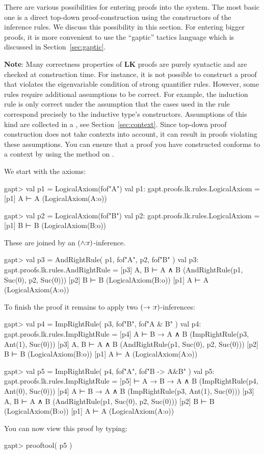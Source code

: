 \documentclass[a4paper,11pt]{book}
\newcommand{\impl}{\to} %
\renewcommand{\land}{\wedge}
\newcommand{\LK}{\textbf{LK}}
\newcommand{\mt}[1]{\textnormal{#1}}
\newcommand{\cli}[1]{{\ttfamily {#1}}}
\begin{document}
There are various possibilities for entering proofs into the system. The most
basic one is a direct top-down proof-construction using the constructors
of the inference rules. We discuss this possibility in this section. For
entering bigger proofs, it is more convenient to use the ``gaptic'' tactics
language which is discussed in Section~\ref{sec:gaptic}.

\textbf{Note}: Many correctness properties of {\LK} proofs are purely syntactic 
and are checked at construction time. For instance, it is not
possible to construct a proof that violates the eigenvariable condition
of strong quantifier rules. However, some rules require additional
assumptions to be correct. For example, the induction rule is only
correct under the assumption that the cases used in the rule
correspond precisely to the inductive type's constructors. Assumptions
of this kind are collected in a \cli{Context}, see Section~\ref{sec:context}.
Since top-down proof construction does not take contexts into account,
it can result in proofs violating these assumptions. You can ensure that
a proof you have constructed conforms to a context \cli{ctx} by using the
\cli{check} method on \cli{ctx}.

We start with the axioms:
%
\begin{clilisting}
gapt> val p1 = LogicalAxiom(fof"A")
val p1: gapt.proofs.lk.rules.LogicalAxiom =
[p1] A ⊢ A    (LogicalAxiom(A:o))

gapt> val p2 = LogicalAxiom(fof"B")
val p2: gapt.proofs.lk.rules.LogicalAxiom =
[p1] B ⊢ B    (LogicalAxiom(B:o))

\end{clilisting}
%
These are joined by an $(\land\mt{:r})$-inference.
\begin{clilisting}
gapt> val p3 = AndRightRule( p1, fof"A", p2, fof"B" )
val p3: gapt.proofs.lk.rules.AndRightRule =
[p3] A, B ⊢ A ∧ B    (AndRightRule(p1, Suc(0), p2, Suc(0)))
[p2] B ⊢ B    (LogicalAxiom(B:o))
[p1] A ⊢ A    (LogicalAxiom(A:o))

\end{clilisting}
%
To finish the proof it remains to apply two $(\impl\mt{:r})$-inferences:
%
\begin{clilisting}
gapt> val p4 = ImpRightRule( p3, fof"B", fof"A & B" )
val p4: gapt.proofs.lk.rules.ImpRightRule =
[p4] A ⊢ B → A ∧ B    (ImpRightRule(p3, Ant(1), Suc(0)))
[p3] A, B ⊢ A ∧ B    (AndRightRule(p1, Suc(0), p2, Suc(0)))
[p2] B ⊢ B    (LogicalAxiom(B:o))
[p1] A ⊢ A    (LogicalAxiom(A:o))

gapt> val p5 = ImpRightRule( p4, fof"A", fof"B -> A&B" )
val p5: gapt.proofs.lk.rules.ImpRightRule =
[p5]  ⊢ A → B → A ∧ B    (ImpRightRule(p4, Ant(0), Suc(0)))
[p4] A ⊢ B → A ∧ B    (ImpRightRule(p3, Ant(1), Suc(0)))
[p3] A, B ⊢ A ∧ B    (AndRightRule(p1, Suc(0), p2, Suc(0)))
[p2] B ⊢ B    (LogicalAxiom(B:o))
[p1] A ⊢ A    (LogicalAxiom(A:o))

\end{clilisting}
%
You can now view this proof by typing:
\begin{clilisting}
gapt> prooftool( p5 )

\end{clilisting}
\end{document}
